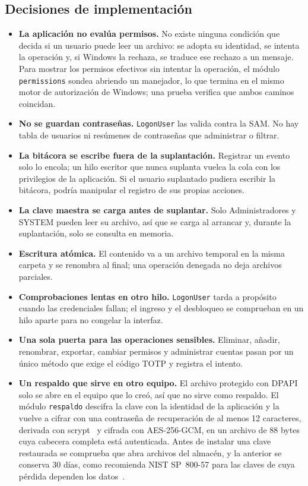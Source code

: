 \documentclass[conference]{IEEEtran}
\begin{document}
\subsection{Decisiones de implementación}
\begin{itemize}
    \item \textbf{La aplicación no evalúa permisos.} No existe ninguna condición que decida si un usuario puede leer un archivo: se adopta su identidad, se intenta la operación y, si Windows la rechaza, se traduce ese rechazo a un mensaje. Para mostrar los permisos efectivos sin intentar la operación, el módulo \texttt{permissions} sondea abriendo un manejador, lo que termina en el mismo motor de autorización de Windows; una prueba verifica que ambos caminos coincidan.
    \item \textbf{No se guardan contraseñas.} \texttt{LogonUser} las valida contra la SAM. No hay tabla de usuarios ni resúmenes de contraseñas que administrar o filtrar.
    \item \textbf{La bitácora se escribe fuera de la suplantación.} Registrar un evento solo lo encola; un hilo escritor que nunca suplanta vuelca la cola con los privilegios de la aplicación. Si el usuario suplantado pudiera escribir la bitácora, podría manipular el registro de sus propias acciones.
    \item \textbf{La clave maestra se carga antes de suplantar.} Solo Administradores y SYSTEM pueden leer su archivo, así que se carga al arrancar y, durante la suplantación, solo se consulta en memoria.
    \item \textbf{Escritura atómica.} El contenido va a un archivo temporal en la misma carpeta y se renombra al final; una operación denegada no deja archivos parciales.
    \item \textbf{Comprobaciones lentas en otro hilo.} \texttt{LogonUser} tarda a propósito cuando las credenciales fallan; el ingreso y el desbloqueo se comprueban en un hilo aparte para no congelar la interfaz.
    \item \textbf{Una sola puerta para las operaciones sensibles.} Eliminar, añadir, renombrar, exportar, cambiar permisos y administrar cuentas pasan por un único método que exige el código TOTP y registra el intento.
    \item \textbf{Un respaldo que sirve en otro equipo.} El archivo protegido con DPAPI solo se abre en el equipo que lo creó, así que no sirve como respaldo. El módulo \texttt{respaldo} descifra la clave con la identidad de la aplicación y la vuelve a cifrar con una contraseña de recuperación de al menos 12 caracteres, derivada con scrypt~\cite{rfc7914} y cifrada con AES-256-GCM, en un archivo de 88 bytes cuya cabecera completa está autenticada. Antes de instalar una clave restaurada se comprueba que abra archivos del almacén, y la anterior se conserva 30 días, como recomienda NIST SP~800-57 para las claves de cuya pérdida dependen los datos~\cite{sp80057}.

\end{itemize}
\end{document}
